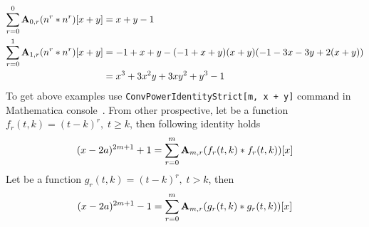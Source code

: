 \begin{equation*}
    \begin{split}
        \sum_{r=0}^{0} {\mathbf{A}} \sb{0,r} (n \sp{r} \ast n \sp{r}) [x+y]
        &= x + y - 1 \\
        \sum_{r=0}^{1} {\mathbf{A}} \sb{1,r} (n \sp{r} \ast n \sp{r}) [x+y]
        &= -1 + x + y - (-1 + x + y) (x + y) (-1 - 3 x - 3 y + 2 (x + y)) \\
        &= x^3 + 3 x^2 y + 3 x y^2 + y^3 - 1
    \end{split}
\end{equation*}
To get above examples use \texttt{ConvPowerIdentityStrict[m, x + y]} command in Mathematica console~\cite{mmca_package}.
From other prospective, let be a function $f_r(t,k) = (t-k)^r, \; t \geq k$, then following identity holds
\begin{equation}
(x-2a)
    ^{2m+1} + 1 =\sum_{r=0}^{m} {\mathbf{A}} \sb{m,r} (f_r(t,k) \ast f_r(t,k))[x]
    \label{eq:parametric-identity}
\end{equation}
Let be a function $g_r(t,k) = (t-k)^r, \; t > k$, then
\begin{equation}
(x-2a)
    ^{2m+1} - 1 =\sum_{r=0}^{m} {\mathbf{A}} \sb{m,r} (g_r(t,k) \ast g_r(t,k))[x]
    \label{eq:parametric-identity-strict}
\end{equation}


